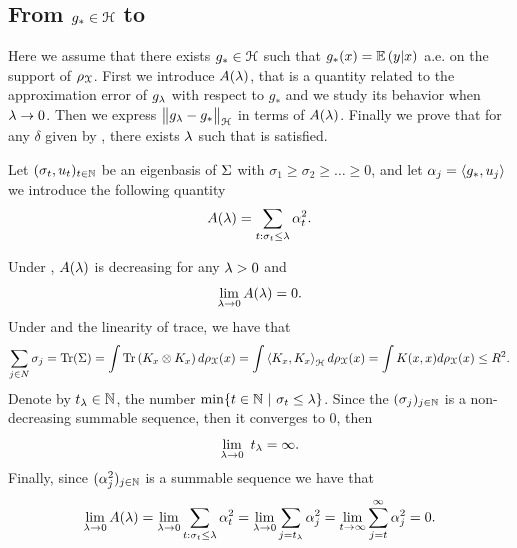 \subsection{From \texorpdfstring{$g_\ast \in \mathcal H$}{gstar} to }\label{sect:from-g-in-H-to-A5}

Here we assume that there exists $g_\ast \in \mathcal H$ such that $g_\ast(x) = \mathbb{E}\left({y}\middle|{x}\right)$ a.e. on the support of ${\rho_{{\mathcal X}}}$. 
First we introduce $A(\lambda)$, that is a quantity related to the approximation error of $g_\lambda$ with respect to $g_\ast$ and we study its behavior when $\lambda \to 0$. Then we express $\bigl\|{g_\lambda - g_\ast}\bigr\|_\mathcal H$ in terms of $A(\lambda)$. Finally we prove that for any $\delta$ given by , there exists $\lambda$ such that  is satisfied.

Let $(\sigma_t, u_t)_{t \in \mathbb N}$ be an eigenbasis of $\Sigma$ with $\sigma_1 \geq \sigma_2 \geq \dots \geq 0$, and let $\alpha_j = \left\langle{g_\ast},{u_j}\right\rangle$ we introduce the following quantity 
$$A(\lambda) = \sum_{t : \sigma_t \leq \lambda} \alpha_t^2.$$

\blm\label{lm:Ala-go-to-0}
Under , $A(\lambda)$ is decreasing for any $\lambda > 0$ and
$$\lim_{\lambda \to 0} A(\lambda) = 0.$$
\elm
\bpr
Under  and the linearity of trace, we have that
$$\sum_{j \in N} \sigma_j = \operatorname{Tr}(\Sigma) = \int \operatorname{Tr}\left(K_x \otimes K_x\right) d{\rho_{{\mathcal X}}}(x) = \int \left\langle{K_x},{K_x}\right\rangle_\mathcal H d{\rho_{{\mathcal X}}}(x) = \int K(x,x) d{\rho_{{\mathcal X}}}(x) \leq R^2.$$
Denote by $t_\lambda \in \mathbb N$, the number $\min \{t \in \mathbb N ~|~ \sigma_t \leq \lambda \}$. Since the $(\sigma_j)_{j \in \mathbb N}$ is a non-decreasing summable sequence, then it converges to $0$, then
$$\lim_{\lambda \to 0}~ t_\lambda = \infty.$$
Finally, since $(\alpha_j^2)_{j \in \mathbb N}$ is a summable sequence
we have that 
$$ \lim_{\lambda \to 0} A(\lambda) = \lim_{\lambda \to 0} \sum_{t: \sigma_t \leq \lambda} \alpha_t^2 = \lim_{\lambda \to 0} \sum_{j = t_\lambda} \alpha_j^2 = \lim_{t \to \infty} \sum_{j = t}^\infty \alpha_j^2 = 0.$$
\epr

